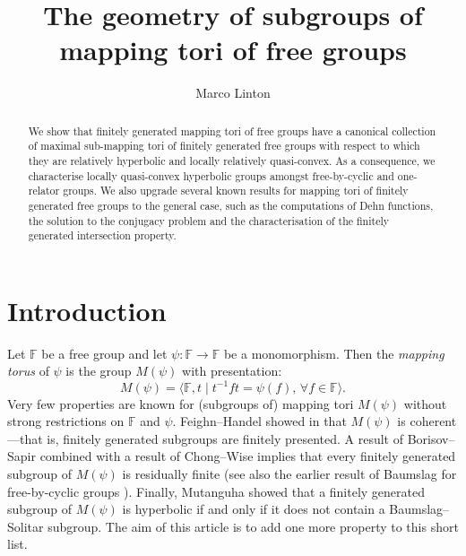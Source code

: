 \documentclass[11pt, a4paper]{amsart}
\theoremstyle{definition}
\newcommand{\F}{\mathbb{F}}
\begin{document}
\title{The geometry of subgroups of mapping tori of free groups}


\author{Marco Linton}
\address{Instituto de Ciencias Matem\'aticas, CSIC-UAM-UC3M-UCM, Madrid, Spain}


\begin{abstract}
We show that finitely generated mapping tori of free groups have a canonical collection of maximal sub-mapping tori of finitely generated free groups with respect to which they are relatively hyperbolic and locally relatively quasi-convex. As a consequence, we characterise locally quasi-convex hyperbolic groups amongst free-by-cyclic and one-relator groups. We also upgrade several known results for mapping tori of finitely generated free groups to the general case, such as the computations of Dehn functions, the solution to the conjugacy problem and the characterisation of the finitely generated intersection property.
\end{abstract}


\maketitle

\section{Introduction}

Let $\F$ be a free group and let $\psi\colon \F\to \F$ be a monomorphism. Then the \emph{mapping torus} of $\psi$ is the group $M(\psi)$ with presentation:
\[
M(\psi) = \langle \F, t \mid t^{-1}ft = \psi(f), \,\forall f\in \F\rangle.
\]
Very few properties are known for (subgroups of) mapping tori $M(\psi)$ without strong restrictions on $\F$ and $\psi$. Feighn--Handel showed in \cite{FH99} that $M(\psi)$ is coherent ---that is, finitely generated subgroups are finitely presented. A result of Borisov--Sapir \cite{BS05} combined with a result of Chong--Wise \cite{CW24} implies that every finitely generated subgroup of $M(\psi)$ is residually finite (see also the earlier result of Baumslag for free-by-cyclic groups \cite{Ba71}). Finally, Mutanguha \cite{Mu21} showed that a finitely generated subgroup of $M(\psi)$ is hyperbolic if and only if it does not contain a Baumslag--Solitar subgroup. The aim of this article is to add one more property to this short list.
\end{document}
